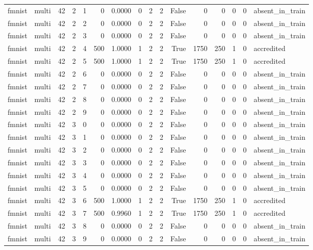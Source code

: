 \begin{tabular}{llrrrrrrrrrrrrrl}
fmnist & multi & 42 & 2 & 1 & 0 & 0.0000 & 0 & 2 & 2 & False & 0 & 0 & 0 & 0 & absent\_in\_train \\
fmnist & multi & 42 & 2 & 2 & 0 & 0.0000 & 0 & 2 & 2 & False & 0 & 0 & 0 & 0 & absent\_in\_train \\
fmnist & multi & 42 & 2 & 3 & 0 & 0.0000 & 0 & 2 & 2 & False & 0 & 0 & 0 & 0 & absent\_in\_train \\
fmnist & multi & 42 & 2 & 4 & 500 & 1.0000 & 1 & 2 & 2 & True & 1750 & 250 & 1 & 0 & accredited \\
fmnist & multi & 42 & 2 & 5 & 500 & 1.0000 & 1 & 2 & 2 & True & 1750 & 250 & 1 & 0 & accredited \\
fmnist & multi & 42 & 2 & 6 & 0 & 0.0000 & 0 & 2 & 2 & False & 0 & 0 & 0 & 0 & absent\_in\_train \\
fmnist & multi & 42 & 2 & 7 & 0 & 0.0000 & 0 & 2 & 2 & False & 0 & 0 & 0 & 0 & absent\_in\_train \\
fmnist & multi & 42 & 2 & 8 & 0 & 0.0000 & 0 & 2 & 2 & False & 0 & 0 & 0 & 0 & absent\_in\_train \\
fmnist & multi & 42 & 2 & 9 & 0 & 0.0000 & 0 & 2 & 2 & False & 0 & 0 & 0 & 0 & absent\_in\_train \\
fmnist & multi & 42 & 3 & 0 & 0 & 0.0000 & 0 & 2 & 2 & False & 0 & 0 & 0 & 0 & absent\_in\_train \\
fmnist & multi & 42 & 3 & 1 & 0 & 0.0000 & 0 & 2 & 2 & False & 0 & 0 & 0 & 0 & absent\_in\_train \\
fmnist & multi & 42 & 3 & 2 & 0 & 0.0000 & 0 & 2 & 2 & False & 0 & 0 & 0 & 0 & absent\_in\_train \\
fmnist & multi & 42 & 3 & 3 & 0 & 0.0000 & 0 & 2 & 2 & False & 0 & 0 & 0 & 0 & absent\_in\_train \\
fmnist & multi & 42 & 3 & 4 & 0 & 0.0000 & 0 & 2 & 2 & False & 0 & 0 & 0 & 0 & absent\_in\_train \\
fmnist & multi & 42 & 3 & 5 & 0 & 0.0000 & 0 & 2 & 2 & False & 0 & 0 & 0 & 0 & absent\_in\_train \\
fmnist & multi & 42 & 3 & 6 & 500 & 1.0000 & 1 & 2 & 2 & True & 1750 & 250 & 1 & 0 & accredited \\
fmnist & multi & 42 & 3 & 7 & 500 & 0.9960 & 1 & 2 & 2 & True & 1750 & 250 & 1 & 0 & accredited \\
fmnist & multi & 42 & 3 & 8 & 0 & 0.0000 & 0 & 2 & 2 & False & 0 & 0 & 0 & 0 & absent\_in\_train \\
fmnist & multi & 42 & 3 & 9 & 0 & 0.0000 & 0 & 2 & 2 & False & 0 & 0 & 0 & 0 & absent\_in\_train \\

\end{tabular}

